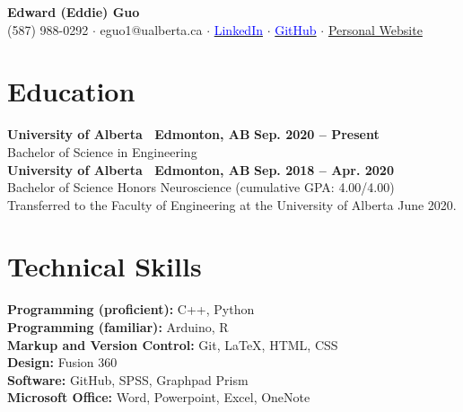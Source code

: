 \documentclass{article}
\begin{document}
\thispagestyle{plain}
\begin{flushleft}
    \LARGE \textbf{\textcolor{my_red}{Edward (Eddie) Guo}}\\ \vspace{0.25em}
    \normalfont \normalsize (587) 988-0292 $\cdot$ eguo1@ualberta.ca $\cdot$ \href{https://www.linkedin.com/in/eguo1}{\textcolor{blue}{LinkedIn}} $\cdot$ \href{https://github.com/tig3r66}{\textcolor{blue}{GitHub}} $\cdot$ \href{https://tig3r66.github.io/index.html}{Personal Website}\\
    \hrulefill
\end{flushleft}

\section*{\textcolor{my_red}{Education}}
    \textbf{University of Alberta \textbar\ Edmonton, AB} \hfill \textbf{Sep. 2020 -- Present}\\
    Bachelor of Science in Engineering\\

    \textbf{University of Alberta \textbar\ Edmonton, AB} \hfill \textbf{Sep. 2018 -- Apr. 2020}\\
    Bachelor of Science Honors Neuroscience (cumulative GPA: 4.00/4.00)\\
    Transferred to the Faculty of Engineering at the University of Alberta June 2020.


\section*{\textcolor{my_red}{Technical Skills}}
\textbf{Programming (proficient):} C++, Python\\
\textbf{Programming (familiar):} Arduino, R\\
\textbf{Markup and Version Control:} Git, \LaTeX, HTML, CSS\\
\textbf{Design:} Fusion 360\\
\textbf{Software:} GitHub, SPSS, Graphpad Prism\\
\textbf{Microsoft Office:} Word, Powerpoint, Excel, OneNote


\end{document}
